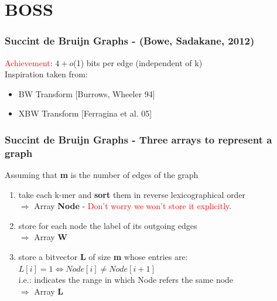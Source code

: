 \section{BOSS}

\begin{frame}
\frametitle{Succint de Bruijn Graphs - (Bowe, Sadakane, 2012)}
\textcolor{red}{Achievement}: $4+o$(1) bits per edge (independent of k)
\\ \medskip
Inspiration taken from:
\begin{itemize}
	\item BW Transform [Burrows, Wheeler 94]	
	\item XBW Transform [Ferragina et al. 05]
\end{itemize}
\end{frame}

\begin{frame}
\frametitle{Succint de Bruijn Graphs - Three arrays to represent a graph}
Assuming that \textbf{m} is the number of edges of the graph
\begin{enumerate}
	\item take each k-mer and \textbf{sort} them in reverse lexicographical order
	\\ $\Rightarrow$ Array \textbf{Node} - \textcolor{red}{Don't worry we won't store it explicitly}.
	\item store for each node the label of its outgoing edges 
	\\ $\Rightarrow$ Array \textbf{W}
	\item store a bitvector \textbf{L} of size \textbf{m} whose entries are: $L[i] = 1 \Leftrightarrow Node[i] ≠ Node[i+1]$ \\
	i.e.: indicates the range in which Node refers the same node
	\\ $\Rightarrow$ Array \textbf{L}
\end{enumerate}
\end{frame}

